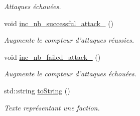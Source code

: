 \begin{DoxyCompactItemize}
\begin{DoxyCompactList}\small\item\em Attaques échouées. \end{DoxyCompactList}\item 
\hypertarget{classFaction_a3d92bdbf463e4bd24824d058d58966f4}{void \hyperlink{classFaction_a3d92bdbf463e4bd24824d058d58966f4}{inc\-\_\-nb\-\_\-successful\-\_\-attack\-\_\-} ()}\label{classFaction_a3d92bdbf463e4bd24824d058d58966f4}

\begin{DoxyCompactList}\small\item\em Augmente le compteur d'attaques réussies. \end{DoxyCompactList}\item 
\hypertarget{classFaction_a29fcb8a676a70b4d0981546bf928bf73}{void \hyperlink{classFaction_a29fcb8a676a70b4d0981546bf928bf73}{inc\-\_\-nb\-\_\-failed\-\_\-attack\-\_\-} ()}\label{classFaction_a29fcb8a676a70b4d0981546bf928bf73}

\begin{DoxyCompactList}\small\item\em Augmente le compteur d'attaques échouées. \end{DoxyCompactList}\item 
std\-::string \hyperlink{classFaction_a75e7b414c89b8a4d75bf4a778e844b74}{to\-String} ()
\begin{DoxyCompactList}\small\item\em Texte représentant une faction. \end{DoxyCompactList}\end{DoxyCompactItemize}
